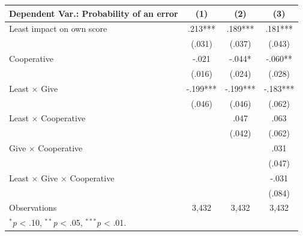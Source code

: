 \begingroup
\centering
\begin{tabular*}{\linewidth}{@{\extracolsep{\fill}}lccc}
   \toprule
   Dependent Var.: Probability of an error & \multicolumn{1}{c}{(1)} & \multicolumn{1}{c}{(2)} & \multicolumn{1}{c}{(3)}\\
   \midrule
   Least impact on own score & \mbox{\hphantom{8}.213***} & \mbox{\hphantom{8}.189***} & \mbox{\hphantom{8}.181***}\\
    & \mbox{(.031)\hphantom{88}} & \mbox{(.037)\hphantom{88}} & \mbox{(.043)\hphantom{88}}\\
   Cooperative & \mbox{-.021\hphantom{888}} & \mbox{-.044*\hphantom{88}} & \mbox{-.060**\hphantom{8}}\\
    & \mbox{(.016)\hphantom{88}} & \mbox{(.024)\hphantom{88}} & \mbox{(.028)\hphantom{88}}\\
   Least $\times$ Give & \mbox{-.199***} & \mbox{-.199***} & \mbox{-.183***}\\
    & \mbox{(.046)\hphantom{88}} & \mbox{(.046)\hphantom{88}} & \mbox{(.062)\hphantom{88}}\\
   Least $\times$ Cooperative &  & \mbox{\hphantom{8}.047\hphantom{888}} & \mbox{\hphantom{8}.063\hphantom{888}}\\
    &  & \mbox{(.042)\hphantom{88}} & \mbox{(.062)\hphantom{88}}\\
   Give $\times$ Cooperative &  &  & \mbox{\hphantom{8}.031\hphantom{888}}\\
    &  &  & \mbox{(.047)\hphantom{88}}\\
   Least $\times$ Give $\times$ Cooperative &  &  & \mbox{-.031\hphantom{888}}\\
    &  &  & \mbox{(.084)\hphantom{88}}\\
   \midrule
   Observations & 3,432 & 3,432 & 3,432\\
   \multicolumn{4}{l}{\footnotesize $^{*}$\textit{p} < .10, $^{**}$\textit{p} < .05, $^{***}$\textit{p} < .01.}\\
   \bottomrule
\end{tabular*}
\par\endgroup
